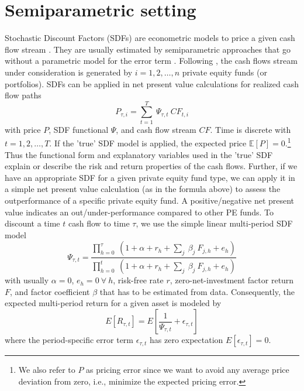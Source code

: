 \documentclass[12pt]{article}
\begin{document}
\section{Semiparametric setting}
\label{sec:semiparametric_setting}

Stochastic Discount Factors (SDFs) are econometric models to price a given cash flow stream \citep{HR87}.
They are usually estimated by semiparametric approaches that go without a parametric model for the error term \citep{F19}.
Following \cite{DLP12}, the cash flows stream under consideration is generated by $i=1,2,\dots,n$ private equity funds (or portfolios).
SDFs can be applied in net present value calculations for realized cash flow paths
\begin{equation}
\label{eq:pricing_error}
P_{\tau, i} =
\sum_{t=1}^{T}\ \Psi_{\tau, t}\ {CF}_{t, i}
\end{equation}
with price $P$, SDF functional $\Psi$, and cash flow stream $CF$. 
Time is discrete with $t=1,2,\dots,T$.
If the 'true' SDF model is applied, the expected price $\mathbb{E}[P]=0$.\footnote{We also refer to $P$ as pricing error since we want to avoid any average price deviation from zero, i.e., minimize the expected pricing error.}
Thus the functional form and explanatory variables used in the 'true' SDF explain or describe the risk and return properties of the cash flows. 
Further, if we have an appropriate SDF for a given private equity fund type, we can apply it in a simple net present value calculation (as in the formula above) to assess the outperformance of a specific private equity fund. 
A positive/negative net present value indicates an out/under-performance compared to other PE funds.
To discount a time $t$ cash flow to time $\tau$, we use the simple linear multi-period SDF model
\begin{equation}
\label{eq:linear_sdf}
\Psi_{\tau,t} =
\frac{
	\prod_{h=0}^{\tau}\ \left(1 + \alpha + r_{h} + \sum_j\ \beta_j\ F_{j,h} + e_h \right)
}{
	\prod_{h=0}^{t}\ \left(1+ \alpha + r_{h} + \sum_j\ \beta_j\ F_{j,h} + e_h \right)
}
\end{equation}
with usually $\alpha=0$, $e_h=0 \ \forall \ h$, risk-free rate $r$, zero-net-investment factor return $F$, and factor coefficient $\beta$ that has to be estimated from data. 
Consequently, the expected multi-period return for a given asset is modeled by
\[
E \left[R_{\tau,t} \right] = 
E \left[ \frac{1}{\Psi_{\tau,t}} + \epsilon_{\tau,t} \right]
\]
where the period-specific error term $\epsilon_{\tau,t}$ has zero expectation $E[\epsilon_{\tau,t}]=0$.
\end{document}
